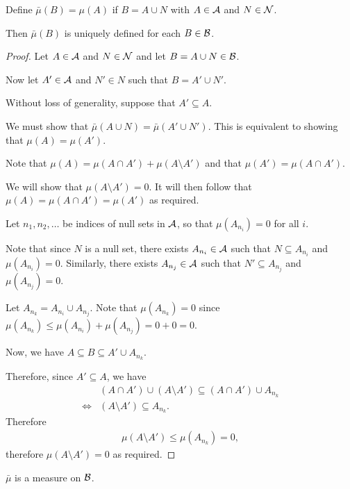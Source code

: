 \begin{claim*}
  Define $\bar{\mu}(B) = \mu(A)$ if $B = A \cup N$ with $A \in \mathcal A$ and $N \in \mathcal N$.

  Then $\bar{\mu}(B)$ is uniquely defined for each $B \in \mathcal B$.
\end{claim*}

\begin{proof}
  Let $A \in \mathcal A$ and $N \in \mathcal N$ and let $B = A \cup N \in \mathcal B$.

  Now let $A' \in \mathcal A$ and $N' \in N$ such that $B = A' \cup N'$.

  Without loss of generality, suppose that $A' \subseteq A$.

  We must show that $\bar{\mu}(A \cup N) = \bar{\mu}(A' \cup N')$. This is equivalent to showing
  that $\mu(A) = \mu(A')$.

  Note that $\mu(A) = \mu(A \cap A') + \mu(A \setminus A')$ and that $\mu(A') = \mu(A \cap A')$.

  We will show that $\mu(A \setminus A') = 0$. It will then follow that $\mu(A) = \mu(A \cap A') = \mu(A')$ as
  required.

  Let $n_1, n_2, \dots$ be indices of null sets in $\mathcal A$, so that $\mu(A_{n_i}) = 0$ for all $i$.

  Note that since $N$ is a null set, there exists $A_{n_i} \in \mathcal A$ such that $N \subseteq A_{n_i}$
  and $\mu(A_{n_i}) = 0$. Similarly, there exists $A_{n_j} \in \mathcal A$ such that $N' \subseteq A_{n_j}$
  and $\mu(A_{n_j}) = 0$.

  Let $A_{n_k} = A_{n_i} \cup A_{n_j}$. Note that $\mu(A_{n_k}) = 0$
  since $\mu(A_{n_k}) \leq \mu(A_{n_i}) + \mu(A_{n_j}) = 0 + 0 = 0$.

  Now, we have $A \subseteq B \subseteq A' \cup A_{n_k}$.

  Therefore, since $A' \subseteq A$, we have
  \begin{align*}
        &(A \cap A') \cup (A \setminus A') \subseteq (A \cap A') \cup A_{n_k} \\
    \iff &(A \setminus A') \subseteq A_{n_k}.
  \end{align*}
  Therefore
  \begin{align*}
    \mu(A \setminus A') \leq \mu(A_{n_k}) = 0,
  \end{align*}
  therefore $\mu(A \setminus A') = 0$ as required.
\end{proof}

\begin{claim*}
  $\bar{\mu}$ is a measure on $\mathcal B$.
\end{claim*}


